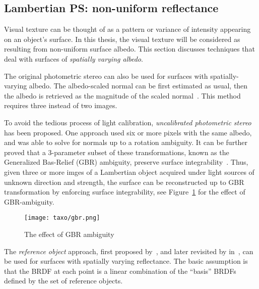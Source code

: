 \subsection{Lambertian PS: non-uniform reflectance}
Visual texture can be thought of as a pattern or variance of intensity appearing on an object's surface. In this thesis, the visual texture will be considered as resulting from non-uniform surface albedo. This section discusses techniques that deal with surfaces of \textit{spatially varying albedo}.

The original photometric stereo can also be used for surfaces with spatially-varying albedo. The albedo-scaled normal can be first estimated as usual, then the albedo is retrieved as the magnitude of the scaled normal~\cite{woodham1980photometric}. This method requires three instead of two images.

To avoid the tedious process of light calibration, \textit{uncalibrated photometric stereo} has been proposed. One approach used six or more pixels with the same albedo, and was able to solve for normals up to a rotation ambiguity\cite{hayakawa1994photometric}. It can be further proved that a 3-parameter subset of these transformations, known as the Generalized Bas-Relief (GBR) ambiguity, preserve surface integrability~\cite{belhumeur1999bas}. Thus, given three or more imges of a Lambertian object acquired under light sources of unknown direction and strength, the surface can be reconstructed up to GBR transformation by enforcing surface integrability, see Figure~\ref{fig:gbr} for the effect of GBR-ambiguity.
\begin{figure}[!htbp]
\centering
\texttt{[image: taxo/gbr.png]}
\caption{The effect of GBR ambiguity}
\label{fig:gbr}
\end{figure}

The \textit{reference object} approach, first proposed by~\citeauthor{silver1980determining}, and later revisited by in~\cite{hertzmann2005example}, can be used for surfaces with spatially varying reflectance. The basic assumption is that the BRDF at each point is a linear combination of the ``basis'' BRDFs defined by the set of reference objects.

